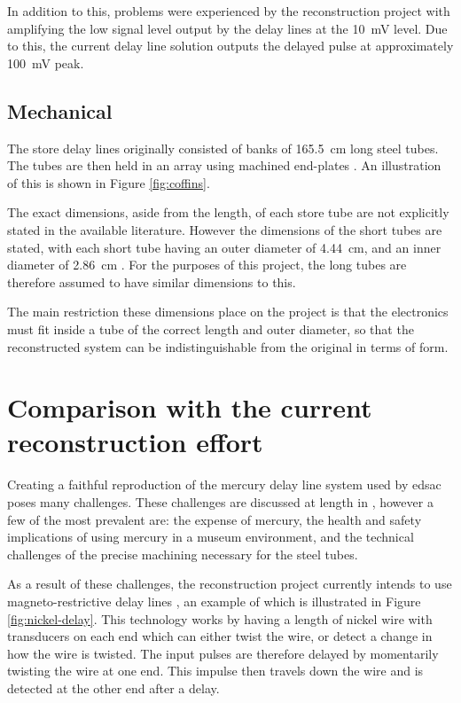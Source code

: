In addition to this, problems were experienced by the reconstruction project with amplifying the low signal level output by the delay lines at the \SI{10}{\milli\volt} level. Due to this, the current delay line solution outputs the delayed pulse at approximately \SI{100}{\milli\volt} peak.

\subsection{Mechanical} \label{sec:review-delay-mech}
\newcommand{\tubeLenCm}{165.5} %
\newcommand{\tubeOdCm}{4.44} %


The store delay lines originally consisted of banks of \SI{\tubeLenCm}{\centi\metre} long steel tubes. The tubes are then held in an array using machined end-plates \cite[p.210]{wilkes1948}. An illustration of this is shown in Figure \ref{fig:coffins}.

The exact dimensions, aside from the length, of each store tube are not explicitly stated in the available literature. However the dimensions of the short tubes are stated, with each short tube having an outer diameter of \SI{\tubeOdCm}{\centi\metre}, and an inner diameter of \SI{2.86}{\centi\metre} \cite[p. 213]{wilkes1948}. For the purposes of this project, the long tubes are therefore assumed to have similar dimensions to this.

The main restriction these dimensions place on the project is that the electronics must fit inside a tube of the correct length and outer diameter, so that the reconstructed system can be indistinguishable from the original in terms of form.

\section{Comparison with the current reconstruction effort} \label{sec:review-comparison}

Creating a faithful reproduction of the mercury delay line system used by \gls{edsac} poses many challenges. These challenges are discussed at length in \cite{tyler2017}, however a few of the most prevalent are: the expense of mercury, the health and safety implications of using mercury in a museum environment, and the technical challenges of the precise machining necessary for the steel tubes.


As a result of these challenges, the reconstruction project currently intends to use magneto-restrictive delay lines \cite{ward2011}, an example of which is illustrated in Figure \ref{fig:nickel-delay}. This technology works by having a length of nickel wire with transducers on each end which can either twist the wire, or detect a change in how the wire is twisted. The input pulses are therefore delayed by momentarily twisting the wire at one end. This impulse then travels down the wire and is detected at the other end after a delay.

